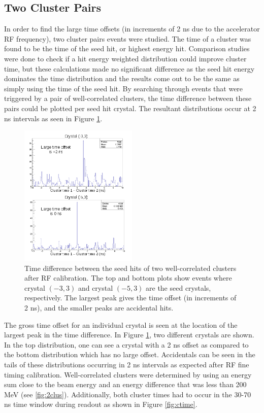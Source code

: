 \documentclass[twoside]{article}
\begin{document}
\begin{multicols}{2}
\subsection{Two Cluster Pairs}
In order to find the large time offsets (in increments of 2 ns due to the accelerator RF frequency), two cluster pairs events were studied. The time of a cluster was found to be the time of the seed hit, or highest energy hit. Comparison studies were done to check if a hit energy weighted distribution could improve cluster time, but these calculations made no significant difference as the seed hit energy dominates the time distribution and the results come out to be the same as simply using the time of the seed hit. By searching through events that were triggered by a pair of well-correlated clusters, the time difference between these pairs could be plotted per seed hit crystal. The resultant distributions occur at 2 ns intervals as seen in Figure \ref{pairsprocedure}. 
\begin{figure}[H]
  \centering
      \includegraphics[width=0.5\textwidth]{pairsProcedure.png}
  \caption{Time difference between the seed hits of two well-correlated clusters after RF calibration. The top and bottom plots show events where crystal $(-3,3)$ and crystal $(-5,3)$ are the seed crystals, respectively. The largest peak gives the time offset (in increments of 2 ns), and the smaller peaks are accidental hits.}
  \label{pairsprocedure}
\end{figure}
The gross time offset for an individual crystal is seen at the location of the largest peak in the time difference. In Figure \ref{pairsprocedure}, two different crystals are shown. In the top distribution, one can see a crystal with a 2 ns offset as compared to the bottom distribution which has no large offset. Accidentals can be seen in the tails of these distributions occurring in 2 ns intervals as expected after RF fine timing calibration. Well-correlated clusters were determined by using an energy sum close to the beam energy and an energy difference that was less than 200 MeV (see \ref{fig:2clus}). Additionally, both cluster times had to occur in the 30-70 ns time window during readout as shown in Figure \ref{fig:ctime}.\\

\end{multicols}
\end{document}
